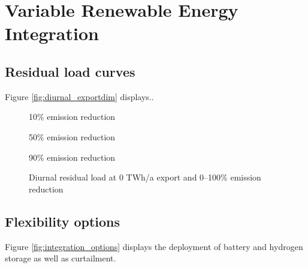 
\section{Variable Renewable Energy Integration}

\subsection{Residual load curves}
\label{subsec:rlc}

Figure \ref{fig:diurnal_exportdim} displays..

\begin{figure*}[h] %
    \centering
    \begin{subfigure}[b]{0.3\linewidth}
        \centering
        \caption{10\% emission reduction}
        \label{fig:diurnal_10emred}
    \end{subfigure}
    \hfill
    \begin{subfigure}[b]{0.3\linewidth}
        \centering
        \caption{50\% emission reduction}
        \label{fig:diurnal_50emred}
    \end{subfigure}
    \hfill
    \begin{subfigure}[b]{0.3\linewidth}
        \centering
        \caption{90\% emission reduction}
        \label{fig:diurnal_90emred}
    \end{subfigure}
    \hfill
    \caption{Export dependent (0--200 TWh) residual load curves with various integration options. Each row represents different integration strategies (RLC without integration, RLC with curtailment, RLC with curtailment and electrolyser load).
    Each column represents different climate ambitions (10--90\% emission reduction)}
    \label{fig:diurnal_exportdim}
\end{figure*}


\begin{figure}[h!]
    \centering
    \caption{Diurnal residual load at 0 TWh/a export and 0--100\% emission reduction}
    \label{fig:diurnal}
\end{figure}

\subsection{Flexibility options}
\label{flex-options}
Figure \ref{fig:integration_options} displays the deployment of battery and hydrogen storage as well as curtailment.

